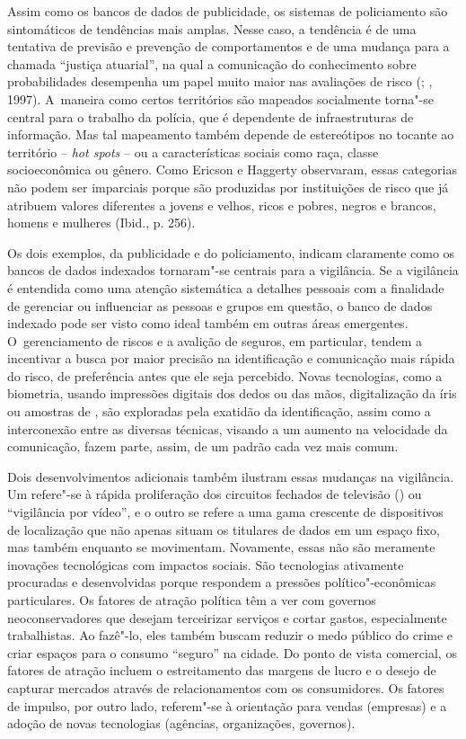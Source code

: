 Assim como os bancos de dados de publicidade, os sistemas de
policiamento são sintomáticos de tendências mais amplas. Nesse caso, a
tendência é de uma tentativa de previsão e prevenção de comportamentos e
de uma mudança para a chamada ``justiça atuarial'', na qual a
comunicação do conhecimento sobre probabilidades desempenha um papel
muito maior nas avaliações de risco (; , 1997). A~maneira
como certos territórios são mapeados socialmente torna"-se central para o
trabalho da polícia, que é dependente de infraestruturas de informação.
Mas tal mapeamento também depende de estereótipos no tocante ao
território -- \emph{hot spots} -- ou a características sociais como
raça, classe socioeconômica ou gênero. Como Ericson e Haggerty
observaram, essas categorias não podem ser imparciais porque são
produzidas por instituições de risco que já atribuem valores diferentes
a jovens e velhos, ricos e pobres, negros e brancos, homens e mulheres
(Ibid., p. 256).

Os dois exemplos, da publicidade e do policiamento, indicam claramente
como os bancos de dados indexados tornaram"-se centrais para a
vigilância. Se a vigilância é entendida como uma atenção sistemática a
detalhes pessoais com a finalidade de gerenciar ou influenciar as
pessoas e grupos em questão, o banco de dados indexado pode ser visto
como ideal também em outras áreas emergentes. O~gerenciamento de riscos
e a avalição de seguros, em particular, tendem a incentivar a busca por
maior precisão na identificação e comunicação mais rápida do risco, de
preferência antes que ele seja percebido. Novas tecnologias, como a
biometria, usando impressões digitais dos dedos ou das mãos,
digitalização da íris ou amostras de , são exploradas pela exatidão
da identificação, assim como a interconexão entre as diversas técnicas,
visando a um aumento na velocidade da comunicação, fazem parte, assim,
de um padrão cada vez mais comum.

Dois desenvolvimentos adicionais também ilustram essas mudanças na
vigilância. Um refere"-se à rápida proliferação dos circuitos fechados de
televisão () ou ``vigilância por vídeo'', e o outro se refere a uma
gama crescente de dispositivos de localização que não apenas situam os
titulares de dados em um espaço fixo, mas também enquanto se movimentam.
Novamente, essas não são meramente inovações tecnológicas com impactos
sociais. São tecnologias ativamente procuradas e desenvolvidas porque
respondem a pressões político"-econômicas particulares. Os fatores de
atração política têm a ver com governos neoconservadores que desejam
terceirizar serviços e cortar gastos, especialmente trabalhistas. Ao
fazê"-lo, eles também buscam reduzir o medo público do crime e criar
espaços para o consumo ``seguro'' na cidade. Do ponto de vista
comercial, os fatores de atração incluem o estreitamento das margens de
lucro e o desejo de capturar mercados através de relacionamentos com os
consumidores. Os fatores de impulso, por outro lado, referem"-se à
orientação para vendas (empresas) e a adoção de novas tecnologias
(agências, organizações, governos).

